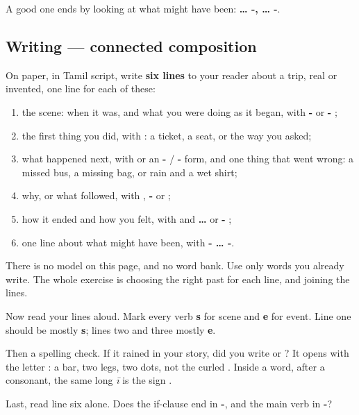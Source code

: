 A good one ends by looking at what might have been: \textbf{… -, … -}.

\subsection*{Writing — connected composition}
On paper, in Tamil script, write \textbf{six lines} to your reader about a trip, real or invented, one line for each of these:

\begin{enumerate}
\raggedright
  \item the scene: when it was, and what you were doing as it began, with \textbf{-} or \textbf{- };
  \item the first thing you did, with \textbf{}: a ticket, a seat, or the way you asked;
  \item what happened next, with \textbf{ } or an \textbf{-} / \textbf{-} form, and one thing that went wrong: a missed bus, a missing bag, or rain and a wet shirt;
  \item why, or what followed, with \textbf{}, \textbf{-} or \textbf{};
  \item how it ended and how you felt, with \textbf{} and \textbf{ … } or \textbf{- };
  \item one line about what might have been, with \textbf{- … -}.
\end{enumerate}

There is no model on this page, and no word bank. Use only words you already write. The whole exercise is choosing the right past for each line, and joining the lines.

\begin{tcolorbox}[breakable,colback=teal!4,colframe=teal!35!black,title={Before you move on}]
Now read your lines aloud. Mark every verb \textbf{s} for scene and \textbf{e} for event. Line one should be mostly \textbf{s}; lines two and three mostly \textbf{e}.

Then a spelling check. If it rained in your story, did you write \textbf{} or \textbf{}? It opens with the letter \textbf{}: a bar, two legs, two dots, not the curled \textbf{}. Inside a word, after a consonant, the same long \emph{ī} is the sign .

Last, read line six alone. Does the if-clause end in \textbf{-}, and the main verb in \textbf{-}?
\end{tcolorbox}
